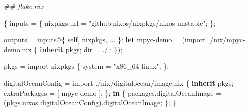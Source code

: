 \documentclass[
]{article}
\newenvironment{Shaded}{}{}
\newcommand{\BuiltInTok}[1]{\textcolor[rgb]{0.00,0.50,0.00}{#1}}
\newcommand{\CommentTok}[1]{\textcolor[rgb]{0.38,0.63,0.69}{\textit{#1}}}
\newcommand{\KeywordTok}[1]{\textcolor[rgb]{0.00,0.44,0.13}{\textbf{#1}}}
\newcommand{\NormalTok}[1]{#1}
\newcommand{\OperatorTok}[1]{\textcolor[rgb]{0.40,0.40,0.40}{#1}}
\newcommand{\SpecialStringTok}[1]{\textcolor[rgb]{0.73,0.40,0.53}{#1}}
\newcommand{\StringTok}[1]{\textcolor[rgb]{0.25,0.44,0.63}{#1}}
\newcommand{\VariableTok}[1]{\textcolor[rgb]{0.10,0.09,0.49}{#1}}
\begin{document}
\begin{Shaded}
  \begin{Highlighting}[]
    \CommentTok{\#\# flake.nix}

    \OperatorTok{\{}
    \VariableTok{inputs} \OperatorTok{=} \OperatorTok{\{}
    \VariableTok{nixpkgs}\NormalTok{.}\VariableTok{url} \OperatorTok{=} \StringTok{"github:nixos/nixpkgs/nixos{-}unstable"}\OperatorTok{;}
    \OperatorTok{\};}

    \VariableTok{outputs} \OperatorTok{=}\NormalTok{ inputs@}\OperatorTok{\{} \VariableTok{self}\OperatorTok{,} \VariableTok{nixpkgs}\OperatorTok{,} \OperatorTok{...} \OperatorTok{\}}\NormalTok{:}
    \KeywordTok{let}
    \VariableTok{mpyc{-}demo} \OperatorTok{=} \OperatorTok{(}\BuiltInTok{import} \SpecialStringTok{./nix/mpyc{-}demo.nix} \OperatorTok{\{} \KeywordTok{inherit}\NormalTok{ pkgs}\OperatorTok{;} \VariableTok{dir} \OperatorTok{=} \SpecialStringTok{./.}\OperatorTok{;} \OperatorTok{\});}

    \VariableTok{pkgs} \OperatorTok{=} \BuiltInTok{import}\NormalTok{ nixpkgs }\OperatorTok{\{}
    \VariableTok{system} \OperatorTok{=} \StringTok{"x86\_64{-}linux"}\OperatorTok{;}
    \OperatorTok{\};}

    \VariableTok{digitalOceanConfig} \OperatorTok{=} \BuiltInTok{import} \SpecialStringTok{./nix/digitalocean/image.nix} \OperatorTok{\{}
    \KeywordTok{inherit}\NormalTok{ pkgs}\OperatorTok{;}
    \VariableTok{extraPackages} \OperatorTok{=} \OperatorTok{[}\NormalTok{ mpyc{-}demo }\OperatorTok{];}
    \OperatorTok{\};}
    \KeywordTok{in}
    \OperatorTok{\{}
    \VariableTok{packages}\NormalTok{.}\VariableTok{digitalOceanImage} \OperatorTok{=} \OperatorTok{(}\NormalTok{pkgs.nixos digitalOceanConfig}\OperatorTok{)}\NormalTok{.digitalOceanImage}\OperatorTok{;}
    \OperatorTok{\};}
    \OperatorTok{\}}
  \end{Highlighting}
\end{Shaded}
\end{document}
